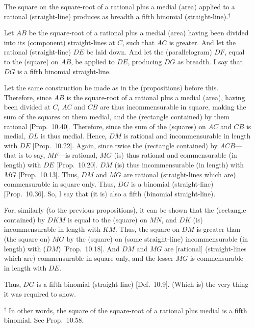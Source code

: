 \begin{Parallel}{}{}
{The square on the square-root of a rational
plus a medial (area) applied to a rational (straight-line) produces as breadth
a fifth binomial (straight-line).$^\dag$

Let $AB$ be the square-root of a rational plus a medial (area) having been divided
into its (component) straight-lines at $C$, such that $AC$ is greater. 
And let the rational (straight-line) $DE$ be laid down. And let the
(parallelogram) $DF$, equal to the (square) on $AB$, be applied
to $DE$, producing $DG$ as breadth. I say that $DG$ is a fifth
binomial straight-line.

\epsfysize=1.5in 
\centerline{}

Let the same construction  be made as in the (propositions)
before this. Therefore, since $AB$ is the square-root of a
rational plus a medial (area), having been  divided at $C$, $AC$ and $CB$ are thus
incommensurable in square, making the sum of the squares on them
medial, and the (rectangle contained) by them rational [Prop.~10.40]. Therefore, since the
sum of the (squares) on $AC$ and $CB$ is medial, $DL$ is thus
medial. Hence, $DM$ is rational and incommensurable
in length with $DE$ [Prop.~10.22]. Again,
since twice the (rectangle contained) by $ACB$---that is to say,
$MF$---is rational, $MG$ (is) thus rational and commensurable
(in length) with $DE$ [Prop.~10.20]. 
$DM$ (is) thus incommensurable (in length) with $MG$ [Prop.~10.13]. Thus, $DM$ and $MG$
are rational (straight-lines which are) commensurable in square only. Thus,
$DG$ is a binomial (straight-line) [Prop.~10.36].
So, I say that (it is) also a fifth (binomial straight-line).

For, similarly (to the previous propositions), it can be shown that the
(rectangle contained) by $DKM$ is equal to the (square) on $MN$,
and $DK$ (is) incommensurable in length with $KM$. Thus, the
square on $DM$ is greater than (the square on) $MG$ by the (square)
on (some straight-line) incommensurable (in length) with ($DM$)
[Prop.~10.18]. And  $DM$ and $MG$
are [rational] (straight-lines which are) commensurable in square only,
and the lesser $MG$ is commensurable in length with $DE$.

Thus, $DG$ is a fifth binomial (straight-line) [Def.~10.9]. (Which is) the very thing it was required to show.}
\end{Parallel}
{\footnotesize\noindent$^\dag$ In other words, the square of the square-root of a rational plus medial  is a
fifth binomial. See Prop.~10.58.}

